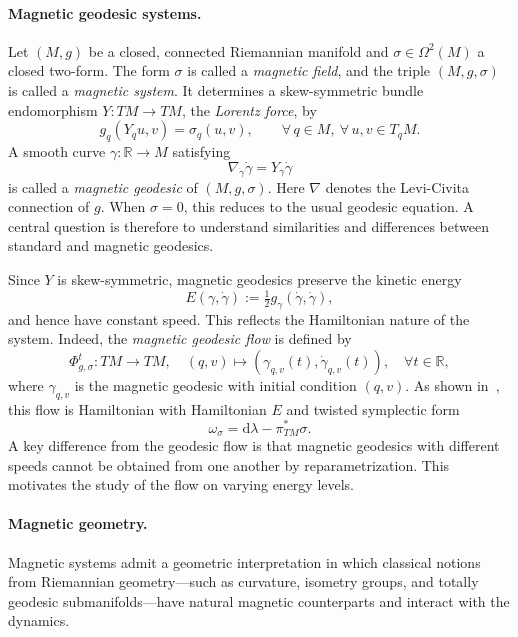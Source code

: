 \documentclass[11pt,reqno]{amsart}
\theoremstyle{plain}
\theoremstyle{definition}
\numberwithin{equation}{section}
\def\d{\delta}
\def\d{\delta}
\def\RR{{\mathbb R}}
\def\d{{\mathrm{d}}}
\begin{document}
\paragraph{\textbf{Magnetic geodesic systems.}}
Let $(M,g)$ be a closed, connected Riemannian manifold and $\sigma\in\Omega^2(M)$ a closed two-form. The form $\sigma$ is called a \emph{magnetic field}, and the triple $(M,g,\sigma)$ is called a \emph{magnetic system}. It determines a skew-symmetric bundle endomorphism $Y\colon TM\to TM$, the \emph{Lorentz force}, by
\begin{equation}\label{e:Lorentz}
	g_q\left(Y_qu,v\right)=\sigma_q(u,v),\qquad \forall\, q\in M,\ \forall\,u,v\in T_qM.
\end{equation}
A smooth curve $\gamma\colon \RR\to M$ satisfying
\begin{equation}\label{e:mg}
	\nabla_{\dot\gamma}\dot\gamma= Y_{\gamma}\dot\gamma
\end{equation}
is called a \emph{magnetic geodesic} of $(M,g,\sigma)$. Here $\nabla$ denotes the Levi-Civita connection of $g$. When $\sigma=0$, this reduces to the usual geodesic equation. A central question is therefore to understand similarities and differences between standard and magnetic geodesics.

Since $Y$ is skew-symmetric, magnetic geodesics preserve the kinetic energy
\[
E(\gamma,\dot\gamma):=\tfrac12 g_\gamma(\dot\gamma,\dot\gamma),
\]
and hence have constant speed. This reflects the Hamiltonian nature of the system. Indeed, the \emph{magnetic geodesic flow} is defined by
\[
\varPhi_{g,\sigma}^t\colon TM\to TM,\quad (q,v)\mapsto \left(\gamma_{q,v}(t),\dot\gamma_{q,v}(t)\right),\quad \forall t\in\RR,
\]
where $\gamma_{q,v}$ is the magnetic geodesic with initial condition $(q,v)$. As shown in~\cite{Gin}, this flow is Hamiltonian with Hamiltonian $E$ and twisted symplectic form
\begin{equation}\label{eq:twisted_symplectic_structure}
    \omega_\sigma = \d\lambda - \pi^*_{TM}\sigma.
\end{equation}
A key difference from the geodesic flow is that magnetic geodesics with different speeds cannot be obtained from one another by reparametrization. This motivates the study of the flow on varying energy levels.\\


\paragraph{\textbf{Magnetic geometry.}}
Magnetic systems admit a geometric interpretation in which classical notions from Riemannian geometry—such as curvature, isometry groups, and totally geodesic submanifolds—have natural magnetic counterparts and interact with the dynamics.
\end{document}
